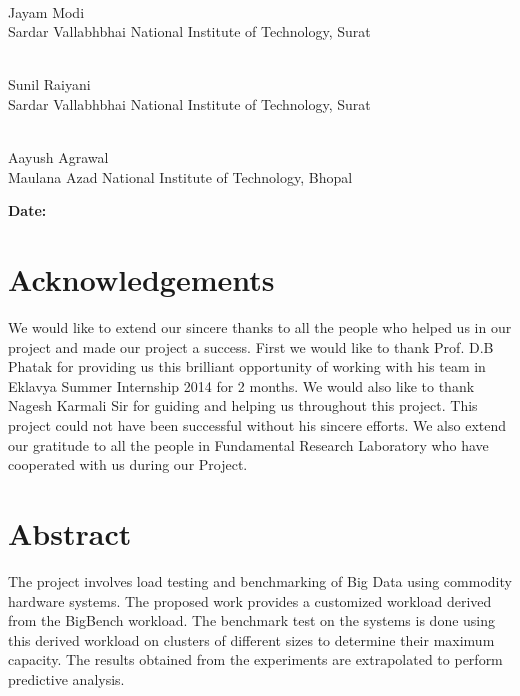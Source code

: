 \documentclass[12pt]{book}
\begin{document}
\vfill
\begin{flushright}

\underline{\hspace{5cm}} \\
Jayam Modi \\
Sardar Vallabhbhai National Institute of Technology, Surat \\

\vfill

\underline{\hspace{5cm}} \\
Sunil Raiyani  \\ 
Sardar Vallabhbhai National Institute of Technology, Surat \\

\vfill

\underline{\hspace{5cm}} \\
Aayush Agrawal \\
Maulana Azad National Institute of Technology, Bhopal \\

\vfill
\end{flushright}

\textbf{Date:} \underline{\hspace{5cm}}

\newpage

\chapter*{Acknowledgements}
We would like to extend our sincere thanks to all the people who helped us in our project and made our project a success.
\noindent
First we would like to thank Prof. D.B Phatak for providing us this brilliant opportunity of working with his team in Eklavya Summer 
Internship 2014 for 2 months. We would also like to thank Nagesh Karmali Sir for guiding and helping us throughout this project. This
project could not have been successful without his sincere efforts. We also extend our gratitude to all the people in Fundamental
Research Laboratory who have cooperated with us during our Project.

\chapter*{Abstract}
The project involves load testing and benchmarking of Big Data using commodity hardware systems.
The proposed work provides a customized workload derived from the BigBench workload. The benchmark test
on the systems is done using this derived workload on clusters of different sizes to determine their maximum capacity. 
The results obtained from the experiments are extrapolated to perform predictive analysis.
\end{document}
